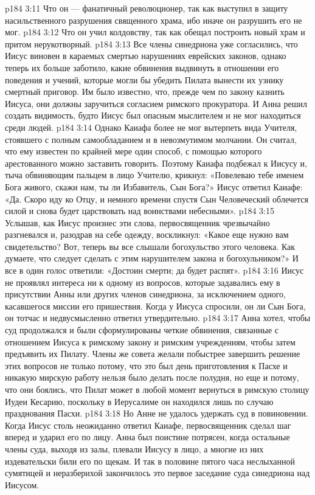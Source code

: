 \vs p184 3:11 \bibnobreakspace Что он --- фанатичный революционер, так как выступил в защиту насильственного разрушения священного храма, ибо иначе он разрушить его не мог.
\vs p184 3:12 \bibnobreakspace Что он учил колдовству, так как обещал построить новый храм и притом нерукотворный.
\vs p184 3:13 \pc Все члены синедриона уже согласились, что Иисус виновен в караемых смертью нарушениях еврейских законов, однако теперь их больше заботило, какие обвинения выдвинуть в отношении его поведения и учений, которые могли бы убедить Пилата вынести их узнику смертный приговор. Им было известно, что, прежде чем по закону казнить Иисуса, они должны заручиться согласием римского прокуратора. И Анна решил создать видимость, будто Иисус был опасным мыслителем и не мог находиться среди людей.
\vs p184 3:14 Однако Каиафа более не мог вытерпеть вида Учителя, стоявшего с полным самообладанием и в невозмутимом молчании. Он считал, что ему известен по крайней мере один способ, с помощью которого арестованного можно заставить говорить. Поэтому Каиафа подбежал к Иисусу и, тыча обвиняющим пальцем в лицо Учителю, крикнул: «Повелеваю тебе именем Бога живого, скажи нам, ты ли Избавитель, Сын Бога?» Иисус ответил Каиафе: «Да. Скоро иду ко Отцу, и немного времени спустя Сын Человеческий облечется силой и снова будет царствовать над воинствами небесными».
\vs p184 3:15 Услышав, как Иисус произнес эти слова, первосвященник чрезвычайно разгневался и, разодрав на себе одежду, воскликнул: «Какое еще нужно вам свидетельство? Вот, теперь вы все слышали богохульство этого человека. Как думаете, что следует сделать с этим нарушителем закона и богохульником?» И все в один голос ответили: «Достоин смерти; да будет распят».
\vs p184 3:16 Иисус не проявлял интереса ни к одному из вопросов, которые задавались ему в присутствии Анны или других членов синедриона, за исключением одного, касавшегося миссии его пришествия. Когда у Иисуса спросили, он ли Сын Бога, он тотчас и недвусмысленно ответил утвердительно.
\vs p184 3:17 Анна хотел, чтобы суд продолжался и были сформулированы четкие обвинения, связанные с отношением Иисуса к римскому закону и римским учреждениям, чтобы затем предъявить их Пилату. Члены же совета желали побыстрее завершить решение этих вопросов не только потому, что это был день приготовления к Пасхе и никакую мирскую работу нельзя было делать после полудня, но еще и потому, что они боялись, что Пилат может в любой момент вернуться в римскую столицу Иудеи Кесарию, поскольку в Иерусалиме он находился лишь по случаю празднования Пасхи.
\vs p184 3:18 Но Анне не удалось удержать суд в повиновении. Когда Иисус столь неожиданно ответил Каиафе, первосвященник сделал шаг вперед и ударил его по лицу. Анна был поистине потрясен, когда остальные члены суда, выходя из залы, плевали Иисусу в лицо, а многие из них издевательски били его по щекам. И так в половине пятого часа неслыханной сумятицей и неразберихой закончилось это первое заседание суда синедриона над Иисусом.
